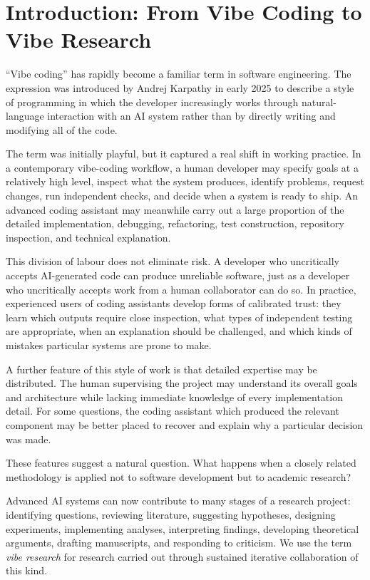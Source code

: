 \section{Introduction: From Vibe Coding to Vibe Research}

``Vibe coding'' has rapidly become a familiar term in software engineering. The expression was introduced by Andrej Karpathy in early 2025 to describe a style of programming in which the developer increasingly works through natural-language interaction with an AI system rather than by directly writing and modifying all of the code.

The term was initially playful, but it captured a real shift in working practice. In a contemporary vibe-coding workflow, a human developer may specify goals at a relatively high level, inspect what the system produces, identify problems, request changes, run independent checks, and decide when a system is ready to ship. An advanced coding assistant may meanwhile carry out a large proportion of the detailed implementation, debugging, refactoring, test construction, repository inspection, and technical explanation.

This division of labour does not eliminate risk. A developer who uncritically accepts AI-generated code can produce unreliable software, just as a developer who uncritically accepts work from a human collaborator can do so. In practice, experienced users of coding assistants develop forms of calibrated trust: they learn which outputs require close inspection, what types of independent testing are appropriate, when an explanation should be challenged, and which kinds of mistakes particular systems are prone to make.

A further feature of this style of work is that detailed expertise may be distributed. The human supervising the project may understand its overall goals and architecture while lacking immediate knowledge of every implementation detail. For some questions, the coding assistant which produced the relevant component may be better placed to recover and explain why a particular decision was made.

These features suggest a natural question. What happens when a closely related methodology is applied not to software development but to academic research?

Advanced AI systems can now contribute to many stages of a research project: identifying questions, reviewing literature, suggesting hypotheses, designing experiments, implementing analyses, interpreting findings, developing theoretical arguments, drafting manuscripts, and responding to criticism. We use the term \emph{vibe research} for research carried out through sustained iterative collaboration of this kind.

